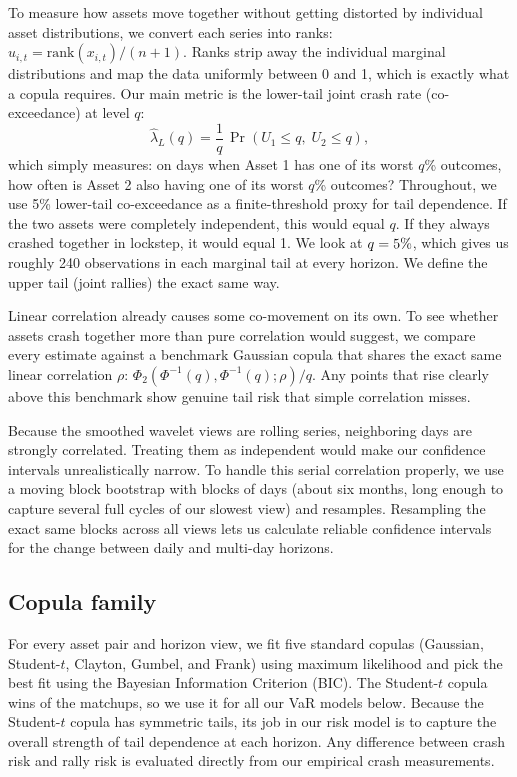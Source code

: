 \documentclass[11pt,a4paper]{article}
\newcommand{\lamL}{\hat\lambda_L}
\begin{document}
To measure how assets move together without getting distorted by individual asset distributions, we convert each series into ranks: $u_{i,t} = \mathrm{rank}(x_{i,t})/(n+1)$. Ranks strip away the individual marginal distributions and map the data uniformly between 0 and 1, which is exactly what a copula requires.
Our main metric is the lower-tail joint crash rate (co-exceedance) at level $q$:
\begin{equation}
\lamL(q) = \frac{1}{q}\,\Pr\!\left(U_1 \le q,\; U_2 \le q\right),
\end{equation}
which simply measures: on days when Asset 1 has one of its worst $q$\% outcomes, how often is Asset 2 also having one of its worst $q$\% outcomes? Throughout, we use 5\% lower-tail co-exceedance as a finite-threshold proxy for tail dependence. If the two assets were completely independent, this would equal $q$. If they always crashed together in lockstep, it would equal 1. We look at $q = 5\%{}$, which gives us roughly 240 observations in each marginal tail at every horizon. We define the upper tail (joint rallies) the exact same way.

Linear correlation already causes some co-movement on its own. To see whether assets crash together more than pure correlation would suggest, we compare every estimate against a benchmark Gaussian copula that shares the exact same linear correlation $\rho$: $\Phi_2(\Phi^{-1}(q),\Phi^{-1}(q);\rho)/q$. Any points that rise clearly above this benchmark show genuine tail risk that simple correlation misses.

Because the smoothed wavelet views are rolling series, neighboring days are strongly correlated. Treating them as independent would make our confidence intervals unrealistically narrow. To handle this serial correlation properly, we use a moving block bootstrap with blocks of \BootBlock{} days (about six months, long enough to capture several full cycles of our slowest view) and \BootReps{} resamples. Resampling the exact same blocks across all views lets us calculate reliable confidence intervals for the change between daily and multi-day horizons.

\subsection{Copula family}

For every asset pair and horizon view, we fit five standard copulas (Gaussian, Student-$t$, Clayton, Gumbel, and Frank) using maximum likelihood and pick the best fit using the Bayesian Information Criterion (BIC). The Student-$t$ copula wins \TWins{} of the \CopulaFits{} matchups, so we use it for all our VaR models below. Because the Student-$t$ copula has symmetric tails, its job in our risk model is to capture the overall strength of tail dependence at each horizon. Any difference between crash risk and rally risk is evaluated directly from our empirical crash measurements.
\end{document}
